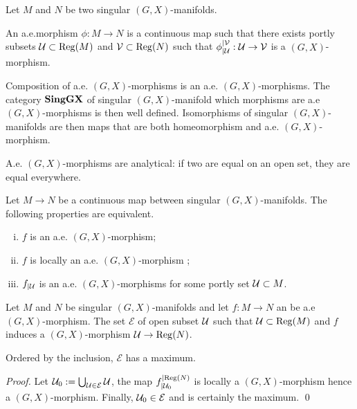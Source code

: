                     
					\begin{defi}[a.e.$(G,X)$-morphism] Let
					$M$ and $N$ be two singular $(G,X)$-manifolds.

					An a.e.morphism $\phi:M\rightarrow N$ is a continuous map such that there exists portly subsets $\mathcal{U}\subset \mathrm{Reg}(M)$ and $\mathcal V\subset \mathrm{Reg}(N)$ such that
					$\phi_{|\mathcal{U}}^{|\mathcal V}:\mathcal{U}\rightarrow \mathcal V$ is a $(G,X)$-morphism.
					\end{defi}

					\begin{rem} Composition of a.e. $(G,X)$-morphisms is an a.e. $(G,X)$-morphisms. The category $\mathbf{SingGX}$ of singular $(G,X)$-manifold which morphisms are a.e $(G,X)$-morphisms is then well defined. 
					Isomorphisms of singular $(G,X)$-manifolds are then maps that are both  homeomorphism and a.e. $(G,X)$-morphism.
					\end{rem}

                    \begin{rem} A.e. $(G,X)$-morphisms are analytical: if two are equal on an open set, they are equal everywhere.
                     
                    \end{rem}

					
					
					\begin{rem}\label{prop:GX_sing_morph_local}
					Let $M\rightarrow N$ be a continuous map between singular $(G,X)$-manifolds.
					The following properties are equivalent.
					\begin{enumerate}[(i)]
					 \item $f$ is an a.e. $(G,X)$-morphism;
					 \item $f$ is locally an a.e. $(G,X)$-morphism ;
					 \item $f_{|\mathcal{U}}$ is an a.e. $(G,X)$-morphisms for some portly set $\mathcal{U}\subset M$.
					\end{enumerate}
					\end{rem}

                \begin{lem} 
                   Let $M$ and $N$ be singular $(G,X)$-manifolds and let $f:M\rightarrow N$ an be a.e $(G,X)$-morphism. 
                   The set $\mathcal E$ of open subset $\mathcal{U}$ such that $\mathcal{U}\subset \mathrm{Reg}(M)$ and $f$ induces a $(G,X)$-morphism $\mathcal{U}\rightarrow \mathrm{Reg}(N)$.   
                   
                   Ordered by the inclusion, $\mathcal E$ has a maximum.
                    
                \end{lem}
                \begin{proof}
                  Let $\mathcal{U}_0:=\bigcup_{\mathcal{U}\in \mathcal E}\mathcal{U}$, the map $f_{|\mathcal{U}_0}^{|\mathrm{Reg}(N)}$ is locally a $(G,X)$-morphism hence a $(G,X)$-morphism. Finally, $\mathcal{U}_0\in \mathcal E$ and is certainly the maximum.
                \qed\end{proof}

